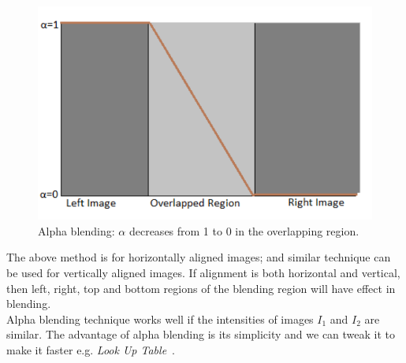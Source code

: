 \begin{figure}[H]%
\centering
\includegraphics[width=0.9\columnwidth]{2.mainmatter/2.Methodology/figures/alpha-blending}%
\caption[Alpha Blending]{Alpha blending: $\alpha$ decreases from 1 to 0 in the overlapping region.}%
\label{fig:alpha-blending}%
\end{figure}

\noindent The above method is for horizontally aligned images; and similar technique can be used for vertically aligned images. If alignment is both horizontal and vertical, then left, right, top and bottom regions of the blending region will have effect in blending.\\

\noindent Alpha blending technique works well if the intensities of images $I_1$ and $I_2$ are similar. The advantage of alpha blending is its simplicity and we can tweak it to make it faster e.g. \emph{Look Up Table}~\cite{rankov:05}. 

